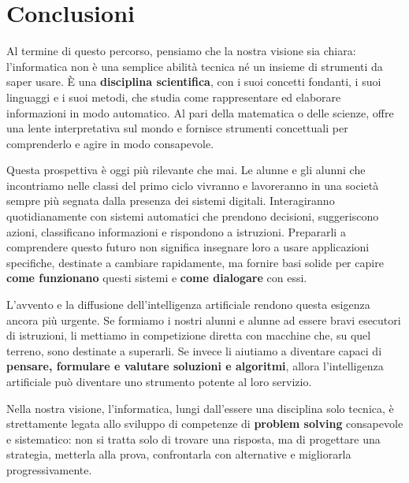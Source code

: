 \chapter{Conclusioni}\label{capitolo-9-conclusioni}
\flushbottom %


Al termine di questo percorso, pensiamo che la nostra visione sia chiara: l'informatica non è una semplice abilità tecnica né un insieme di strumenti da saper usare. È una \textbf{disciplina scientifica}, con i suoi concetti fondanti, i suoi linguaggi e i suoi metodi, che studia come rappresentare ed elaborare informazioni in modo automatico. Al pari della matematica o delle scienze, offre una lente interpretativa sul mondo e fornisce strumenti concettuali per comprenderlo e agire in modo consapevole.

Questa prospettiva è oggi più rilevante che mai. Le alunne e gli alunni che incontriamo nelle classi del primo ciclo vivranno e lavoreranno in una società sempre più segnata dalla presenza dei sistemi digitali. Interagiranno quotidianamente con sistemi automatici che prendono decisioni, suggeriscono azioni, classificano informazioni e rispondono a istruzioni. Prepararli a comprendere questo futuro non significa insegnare loro a usare applicazioni specifiche, destinate a cambiare rapidamente, ma fornire basi solide per capire \textbf{come funzionano} questi sistemi e \textbf{come dialogare} con essi.

L'avvento e la diffusione dell'intelligenza artificiale rendono questa esigenza ancora più urgente. Se formiamo i nostri alunni e alunne ad essere bravi esecutori di istruzioni, li mettiamo in competizione diretta con macchine che, su quel terreno, sono destinate a superarli. Se invece li aiutiamo a diventare capaci di \textbf{pensare, formulare e valutare soluzioni e algoritmi}, allora l'intelligenza artificiale può diventare uno strumento potente al loro servizio.

Nella nostra visione, l'informatica, lungi dall'essere una disciplina solo tecnica, è strettamente legata allo sviluppo di competenze di \textbf{problem solving} consapevole e sistematico: non si tratta solo di trovare una risposta, ma di progettare una strategia, metterla alla prova, confrontarla con alternative e migliorarla progressivamente.

